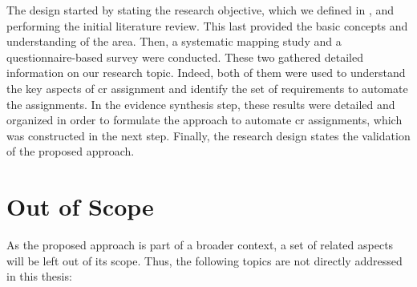 The design started by stating the research objective, which we defined in
, and performing the initial literature
review. This last provided the basic concepts and understanding of the area.
Then, a systematic mapping study and a questionnaire-based survey were
conducted. These two gathered detailed information on our research topic.
Indeed, both of them were used to understand the key aspects of \ac{cr}
assignment and identify the set of requirements to automate the assignments. In
the evidence synthesis step, these results were detailed and organized in order
to formulate the approach to automate \ac{cr} assignments, which was constructed
in the next step. Finally, the research design states the validation of the
proposed approach.

\section{Out of Scope}

As the proposed approach is part of a broader context, a set of related aspects
will be left out of its scope. Thus, the following topics are not directly
addressed in this thesis:


